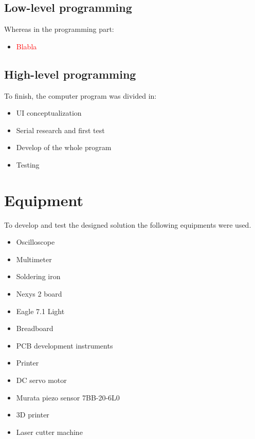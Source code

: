 \subsection{Low-level programming}
Whereas in the programming part:
\begin{itemize}
	\item \textcolor{red}{Blabla}
\end{itemize}
\subsection{High-level programming}
To finish, the computer program was divided in:
\begin{itemize}
	\item UI conceptualization
	\item Serial research and first test
	\item Develop of the whole program
	\item Testing
\end{itemize}
\section{Equipment}
\label{sec:equipment}
To develop and test the designed solution the following equipments were used.
\begin{itemize}
	\item Oscilloscope
	\item Multimeter
	\item Soldering iron
	\item Nexys 2 board
	\item Eagle 7.1 Light
	\item Breadboard
	\item PCB development instruments
	\item Printer
	\item DC servo motor
	\item Murata piezo sensor 7BB-20-6L0
	\item 3D printer
	\item Laser cutter machine
\end{itemize}